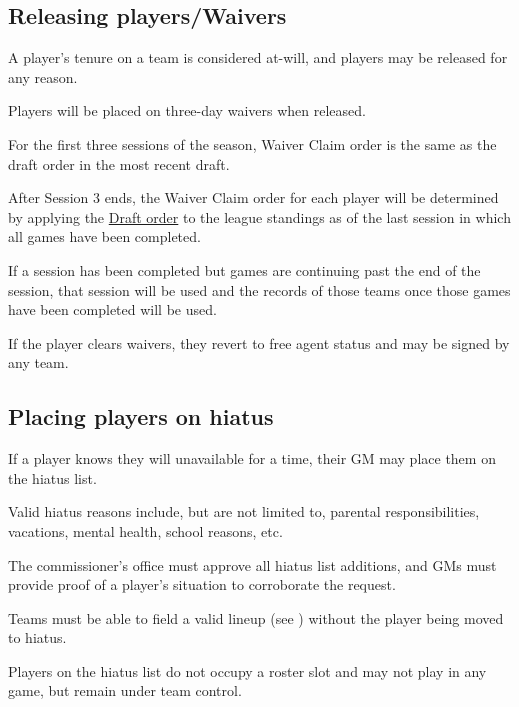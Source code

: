 \subsection{Releasing players/Waivers}
\begin{deepEnumerate}
	\item A player's tenure on a team is considered at-will, and players may be released for any reason.
	\item Players will be placed on three-day waivers when released.
	\begin{deepEnumerate}
		\item For the first three sessions of the season, Waiver Claim order is the same as the draft order in the most recent draft.
		\item After Session 3 ends, the Waiver Claim order for each player will be determined by applying the \hyperref[sec:Draft order]{Draft order}
		to the league standings	as of the last session in which all games have been completed.
		\begin{deepEnumerate}
			\item If a session has been completed but games are continuing past the end of the session, 
			that session will be used and the records of those teams once those games have been completed will be used.
		\end{deepEnumerate}
		\item If the player clears waivers, they revert to free agent status and may be signed by any team.
	\end{deepEnumerate}
\end{deepEnumerate}

\subsection{Placing players on hiatus}
\begin{deepEnumerate}
	\item If a player knows they will unavailable for a time, their GM may place them on the hiatus list.
	\begin{deepEnumerate}
		\item Valid hiatus reasons include, but are not limited to,	parental responsibilities, vacations, mental health, school reasons, etc.
		\item The commissioner's office must approve all hiatus list additions,	and GMs must provide proof of a player's situation to corroborate the request.
		\item Teams must be able to field a valid lineup (see ) without the player being moved to hiatus.
	\end{deepEnumerate}
	\item Players on the hiatus list do not occupy a roster slot and may not play in any game, but remain under team control.
\end{deepEnumerate}

